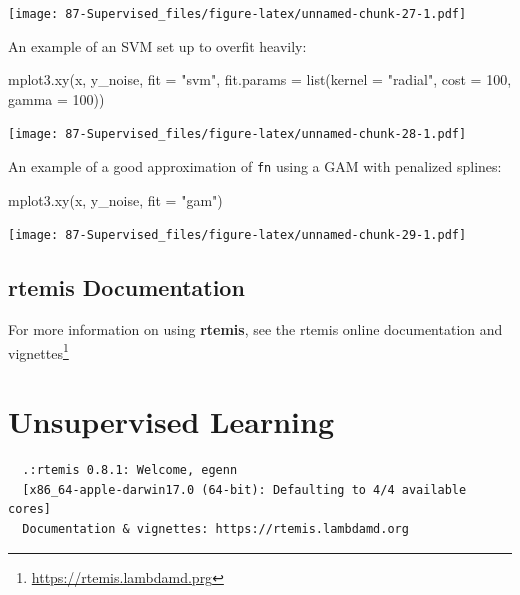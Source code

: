 \documentclass[
]{book}
\newenvironment{Shaded}{\begin{snugshade}}{\end{snugshade}}
\newcommand{\AttributeTok}[1]{\textcolor[rgb]{0.77,0.63,0.00}{#1}}
\newcommand{\DecValTok}[1]{\textcolor[rgb]{0.00,0.00,0.81}{#1}}
\newcommand{\FunctionTok}[1]{\textcolor[rgb]{0.00,0.00,0.00}{#1}}
\newcommand{\NormalTok}[1]{#1}
\newcommand{\StringTok}[1]{\textcolor[rgb]{0.31,0.60,0.02}{#1}}
\DeclareRobustCommand{\href}[2]{#2\footnote{\url{#1}}}
\begin{document}
\texttt{[image: 87-Supervised\_files/figure-latex/unnamed-chunk-27-1.pdf]}

An example of an SVM set up to overfit heavily:

\begin{Shaded}
\begin{Highlighting}[]
\FunctionTok{mplot3.xy}\NormalTok{(x, y\_noise, }\AttributeTok{fit =} \StringTok{"svm"}\NormalTok{,}
          \AttributeTok{fit.params =} \FunctionTok{list}\NormalTok{(}\AttributeTok{kernel =} \StringTok{"radial"}\NormalTok{, }\AttributeTok{cost =} \DecValTok{100}\NormalTok{, }\AttributeTok{gamma =} \DecValTok{100}\NormalTok{))}
\end{Highlighting}
\end{Shaded}

\texttt{[image: 87-Supervised\_files/figure-latex/unnamed-chunk-28-1.pdf]}

An example of a good approximation of \texttt{fn} using a GAM with penalized splines:

\begin{Shaded}
\begin{Highlighting}[]
\FunctionTok{mplot3.xy}\NormalTok{(x, y\_noise, }\AttributeTok{fit =} \StringTok{"gam"}\NormalTok{)}
\end{Highlighting}
\end{Shaded}

\texttt{[image: 87-Supervised\_files/figure-latex/unnamed-chunk-29-1.pdf]}

\hypertarget{rtemis-documentation}{%
\section{\texorpdfstring{\textbf{rtemis} Documentation}{rtemis Documentation}}\label{rtemis-documentation}}

For more information on using \textbf{rtemis}, see the \href{https://rtemis.lambdamd.prg}{rtemis online documentation and vignettes}

\hypertarget{unsupervised}{%
\chapter{Unsupervised Learning}\label{unsupervised}}

\begin{verbatim}
  .:rtemis 0.8.1: Welcome, egenn
  [x86_64-apple-darwin17.0 (64-bit): Defaulting to 4/4 available cores]
  Documentation & vignettes: https://rtemis.lambdamd.org
\end{verbatim}
\end{document}
